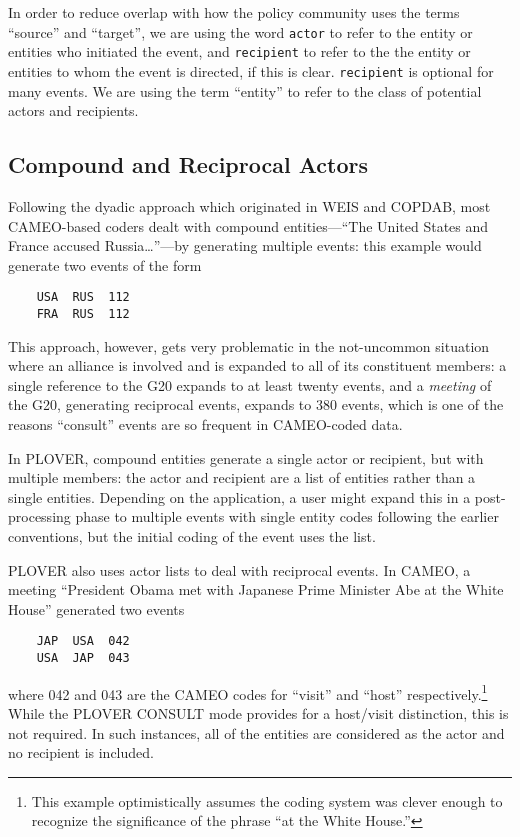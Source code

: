 \documentclass[11pt]{report}
\newcommand{\plcat}[1]{\textsf{#1}}
\newcommand{\txt}[1]{\texttt{#1}}
\begin{document}
In order to reduce overlap with how the policy community uses the terms  ``source'' and ``target'', we are using the word \txt{actor} to refer to the entity or entities who initiated the event, and \txt{recipient} to refer to the
 the entity or entities to whom the event is directed, if this is clear. \txt{recipient} is optional for many events. We are using the term ``entity'' to refer to the class of potential actors and recipients.

\subsection{Compound and Reciprocal Actors}\label{sec:recip}

Following the dyadic approach which originated in WEIS and COPDAB,  most CAMEO-based coders dealt with compound entities---``The United States and France accused Russia\ldots''---by generating multiple events: this example would generate two events of the form
\begin{verbatim}
	USA  RUS  112
	FRA  RUS  112
\end{verbatim}
This approach, however, gets very problematic in the not-uncommon situation where an alliance is involved and is expanded to all of its constituent members: a single reference to the G20 expands to at least twenty events, and a \textit{meeting} of the G20, generating reciprocal events, expands to 380 events, which is one of the reasons ``consult'' events are so frequent in CAMEO-coded data.

In PLOVER, compound entities generate a single actor or recipient, but with multiple members: the actor and recipient are a list of entities rather than a single entities. Depending on the application, a user might expand this in a post-processing phase to multiple events with single entity codes following the earlier conventions, but the initial coding of the event uses the list.

PLOVER also uses actor lists to deal with reciprocal events. In CAMEO, a meeting ``President Obama met with Japanese Prime Minister Abe at the White House'' generated two events
\begin{verbatim}
	JAP  USA  042
	USA  JAP  043
\end{verbatim}
where 042 and 043 are the CAMEO codes for ``visit'' and ``host'' respectively.\footnote{This example optimistically assumes the coding system was clever enough to recognize the significance of the phrase ``at the White House.''} While the PLOVER \plcat{CONSULT} mode provides for a host/visit distinction, this is not required. In such instances, all of the entities are considered as the actor and no recipient is included.
\end{document}
